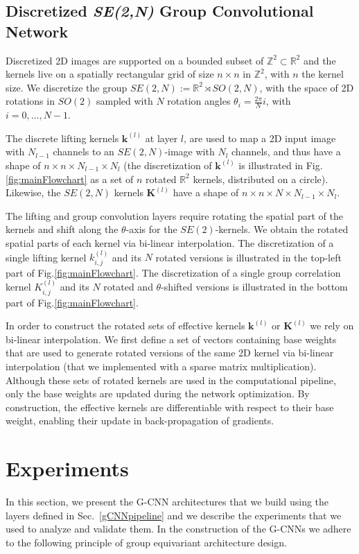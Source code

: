 \documentclass[twocolumn,final]{article}
\newcommand{\se}[1]{\textit{SE(#1)}}
\newcommand{\mset}[2]{$\mathbb{#1}^{#2}$}
\begin{document}
\subsection{Discretized \se{2,N} Group Convolutional Network}
Discretized 2D images are supported on a bounded subset of $\mathbb{Z}^2 \subset \mathbb{R}^2$ and the kernels live on a spatially rectangular grid of size $n\times n$ in $\mathbb{Z}^2$, with $n$ the kernel size.
We discretize the group $SE(2,N):=\mathbb{R}^2 \rtimes SO(2,N)$, with the space of 2D rotations in $SO(2)$ sampled with $N$ rotation angles $\theta_i{=}\frac{2\pi}{N}i$, with $i=0,\dots,N-1$. 

The discrete lifting kernels $\mathbf{k}^{(l)}$ at layer $l$, are used to map a 2D input image with $N_{l-1}$ channels to an $SE(2,N)$-image with $N_{l}$ channels, and thus have a shape of $n \times n \times N_{l-1} \times {N_{l}}$ (the discretization of $\mathbf{k}^{(l)}$ is illustrated in Fig.\ref{fig:mainFlowchart} as a set of $n$ rotated \mset{R}{2} kernels, distributed on a circle).
Likewise, the $SE(2,N)$ kernels $\mathbf{K}^{(l)}$ have a shape of $n \times n \times N \times N_{l-1} \times N_{l}$.

The lifting and group convolution layers require rotating the spatial part of the kernels and shift along the $\theta$-axis for the $SE(2)$-kernels.
We obtain the rotated spatial parts of each kernel via bi-linear interpolation.
The discretization of a single lifting kernel $k_{i,j}^{(l)}$ and its $N$ rotated versions is illustrated in the top-left part of Fig.\ref{fig:mainFlowchart}.
The discretization of a single group correlation kernel $K_{i,j}^{(l)}$ and its $N$ rotated and $\theta$-shifted versions is illustrated in the bottom part of Fig.\ref{fig:mainFlowchart}.

In order to construct the rotated sets of effective kernels $\mathbf{k}^{(l)}$ or $\mathbf{K}^{(l)}$ we rely on bi-linear interpolation. We first define a set of vectors containing base weights that are used to generate rotated versions of the same 2D kernel via bi-linear interpolation (that we implemented with a sparse matrix multiplication).
Although these sets of rotated kernels are used in the computational pipeline, only the base weights are updated during the network optimization.
By construction, the effective kernels are differentiable with respect to their base weight, enabling their update in back-propagation of gradients.

\section{Experiments}
\label{sec:experiments}
In this section, we present the G-CNN architectures that we build using the layers defined in Sec.~\ref{gCNNpipeline} and we describe the experiments that we used to analyze and validate them. In the construction of the G-CNNs we adhere to the following principle of group equivariant architecture design. 
\end{document}
